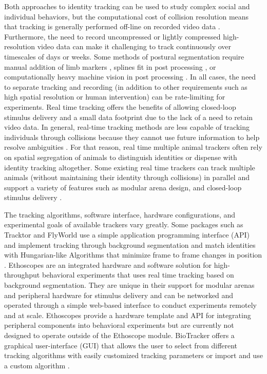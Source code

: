 \documentclass[10pt]{article}
\begin{document}
\begin{multicols}{2}
Both approaches to identity tracking can be used to study complex social and individual behaviors, but the computational cost of collision resolution means that tracking is generally performed off-line on recorded video data \cite{Liu_A_2018}. Furthermore, the need to record uncompressed or lightly compressed high-resolution video data can make it challenging to track continuously over timescales of days or weeks. Some methods of postural segmentation require manual addition of limb markers \cite{Kain_Leg_2013}, splines fit in post processing \cite{Uhlmann_FlyLimbTracker_2017}, or computationally heavy machine vision in post processing \cite{Mathis_DeepLabCut_2018,Pereira_Fast_2018}. In all cases, the need to separate tracking and recording (in addition to other requirements such as high spatial resolution or human intervention) can be rate-limiting for experiments. Real time tracking offers the benefits of allowing closed-loop stimulus delivery and a small data footprint due to the lack of a need to retain video data. In general, real-time tracking methods are less capable of tracking individuals through collisions because they cannot use future information to help resolve ambiguities \cite{Itskovits_A_2017}. For that reason, real time multiple animal trackers often rely on spatial segregation of animals to distinguish identities or dispense with identity tracking altogether\cite{Liu_A_2018}. Some existing real time trackers can track multiple animals (without maintaining their identity through collisions) in parallel and support a variety of features such as modular arena design, and closed-loop stimulus delivery \cite{Geissmann_Ethoscopes_2017,Straw_Multi_2011,Stowers_Virtual_2017,Chagas_The_2017}.

The tracking algorithms, software interface, hardware configurations, and experimental goals of available trackers vary greatly. Some packages such as Tracktor and FlyWorld use a simple application programming interface (API) and implement tracking through background segmentation and match identities with Hungarian-like Algorithms that minimize frame to frame changes in position \cite{Kuhn_The_1955,Rodriguez_ToxId_2017,Liu_A_2018}. Ethoscopes are an integrated hardware and software solution for high-throughput behavioral experiments that uses real time tracking based on background segmentation. They are unique in their support for modular arenas and peripheral hardware for stimulus delivery \cite{Geissmann_Ethoscopes_2017} and can be networked and operated through a simple web-based interface to conduct experiments remotely and at scale. Ethoscopes provide a hardware template and API for integrating peripheral components into behavioral experiments but are currently not designed to operate outside of the Ethoscope module.  BioTracker offers a graphical user-interface (GUI) that allows the user to select from different tracking algorithms with easily customized tracking parameters or import and use a custom algorithm \cite{Mnck_BioTracker_2018}. 


\end{multicols}
\end{document}
